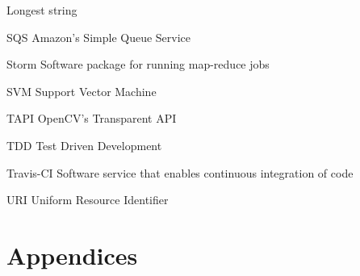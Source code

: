 \documentclass[botnum, fleqn, final]{unmeethesis}
\begin{document}
\begin{glossary}{Longest  string}
    \item[SQS] Amazon's Simple Queue Service
    \item[Storm] Software package for running map-reduce jobs
    \item[SVM] Support Vector Machine
    \item[TAPI] OpenCV's Transparent API
    \item[TDD] Test Driven Development
    \item[Travis-CI] Software service that enables continuous integration of code
    \item[URI] Uniform Resource Identifier
  \end{glossary}

  \mainmatter

  
  
  
  
  

  \chapter*{Appendices}


  \appendix
  
  
  
  

  
  
\end{document}
